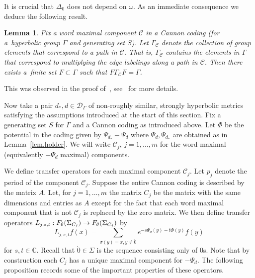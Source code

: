\documentclass[10pt]{amsart}
\newtheorem{lemm}[theo]{Lemma}\newtheorem{prop}[theo]{Proposition}\newtheorem{coro}[theo]{Corollary}\newtheorem{conj}[theo]{Conjecture}
\theoremstyle{definition}\newtheorem{defi}[theo]{Definition}\newtheorem{rema}[theo]{Remark}\newtheorem{exam}[theo]{Example}\newtheorem{exem}[theo]{Example}\newtheorem{nota}[theo]{Notation}
\newcommand{\G}{\Gamma}
\newcommand{\D}{\Delta}
\renewcommand{\o}{\omega}
\renewcommand{\SS}{\Sigma}
\newcommand{\Cc}{\mathcal{C}}
\newcommand{\Dc}{\mathcal{D}}
\newcommand{\C}{\mathbb{C}}
\renewcommand*{\to}{\mathchoice{\longrightarrow}{\rightarrow}{\rightarrow}{\rightarrow}}
\theoremstyle{plain}
\begin{document}
It is crucial that $\D_0$ does not depend on $\o$. As an immediate consequence we deduce the following result.

\begin{lemm}\label{lem.gqt}
Fix a word maximal component $\Cc$ in a Cannon coding (for a~hyperbolic group $\G$ and generating set $S$). Let $\G_\Cc$ denote the collection of group elements that correspond to a path in $\Cc$. That is, $\G_\Cc$ contains the elements in $\G$ that correspond to multiplying the edge labelings along a path in $\Cc$. Then there exists a~finite set $F \subset \G$ such that $F \G_\Cc F = \G$.
\end{lemm}

This was observed in the proof of~\cite[Lemma~4.6]{GMM2018}, see~\cite[Section~4.5]{cantrell.tanaka.1} for more details.


Now take a pair $d_\ast, d \in \Dc_\G$ of non-roughly similar, strongly hyperbolic metrics satisfying the assumptions introduced at the start of this section. Fix a generating set $S$ for $\G$ and a Cannon coding as introduced above. Let $\Phi$ be the potential in the coding given by $\Psi_{d_\ast} - \Psi_d$ where $\Psi_d, \Psi_{d_\ast}$ are obtained as in Lemma~\ref{lem.holder}. We will write $\Cc_j$, $j=1,\dots, m$ for the word maximal (equivalently $-\Psi_d$ maximal) components.

We define transfer operators for each maximal component $\Cc_j$. Let $p_j$ denote the period of the component $\Cc_j$. Suppose the entire Cannon coding is described by the matrix $A$. Let, for $j=1, \dots, m$ the matrix $C_j$ be the matrix with the same dimensions and entries as $A$ except for the fact that each word maximal component that is not $\Cc_j$ is replaced by the zero matrix. We then define transfer operators $L_{j,s, t}: F_\theta(\Sigma_{C_j}) \to F_\theta(\Sigma_{C_j}) $ by
\[
L_{j,s,t} f(x) = \sum_{\sigma(y) = x, y \neq \dot{0}} e^{-s\Psi_d(y) - t\Phi(y)} f(y)
\]
for $s, t \in \C$. Recall that $\dot{0} \in \SS$ is the sequence consisting only of $0$s. Note that by construction each $C_j$ has a unique maximal component for $- \Psi_d$. The following proposition records some of the important properties of these operators.
\end{document}

